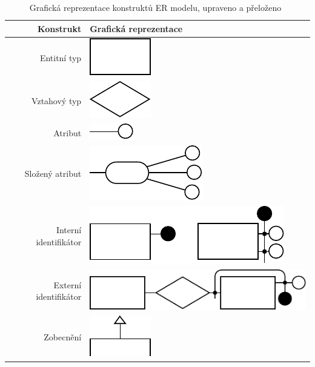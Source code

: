 \begin{table}[!htb]
  \centering
  \begin{tabular}{@{}rm{7cm}@{}} \toprule
    Konstrukt             & Grafická reprezentace                                     \\ \midrule
    Entitní typ           & {\centering\includegraphics{../img/er-model/entity.pdf}}  \\
    Vztahový typ          & \includegraphics{../img/er-model/relationship.pdf}        \\
    Atribut               & \includegraphics{../img/er-model/attribute.pdf}           \\
    Složený atribut       & \includegraphics{../img/er-model/composite-attribute.pdf} \\
    Interní identifikátor & \includegraphics{../img/er-model/identifier.pdf}          \\
    Externí identifikátor & \includegraphics{../img/er-model/external-identifier.pdf} \\
    Zobecnění             & \includegraphics{../img/er-model/generalization.pdf}      \\ \bottomrule
  \end{tabular}
  \caption[Grafická reprezentace konstruktů ER modelu]{Grafická reprezentace konstruktů ER modelu, upraveno a přeloženo~\cite[s.~164]{atzeni_database_1999}}
  \label{tab:er-constructs}
\end{table}

